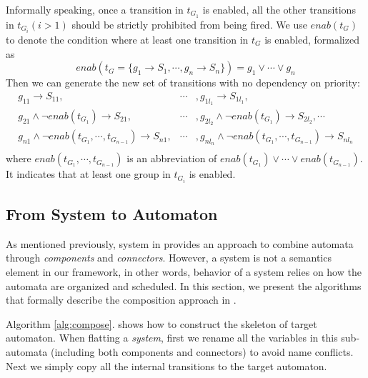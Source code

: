 Informally speaking, once a transition in $t_{G_1}$ is enabled, all the other transitions in $t_{G_i}(i>1)$ should be strictly prohibited from being fired. We use $enab(t_G)$ to denote the condition where at least one transition in $t_G$ is enabled, formalized as
\[
    enab(t_G=\{g_1\rightarrow S_1,\cdots, g_n\rightarrow S_n\}) = g_1\lor\cdots\lor g_n
\]
Then we can generate the new set of transitions with no dependency on priority:
\begin{eqnarray*}
    g_{11}\rightarrow S_{11},&\cdots&,g_{1l_1}\rightarrow S_{1l_1}, \\
    g_{21}\land \lnot enab(t_{G_1})\rightarrow S_{21}, &\cdots&, g_{2l_2} \land \lnot enab(t_{G_1})\rightarrow S_{2l_2}, \cdots \\
    g_{n1}\land \lnot enab(t_{G_1},\cdots,t_{G_{n-1}})\rightarrow S_{n1}, &\cdots&, g_{nl_n} \land \lnot enab(t_{G_1},\cdots,t_{G_{n-1}})\rightarrow S_{nl_n} \\
\end{eqnarray*}
where $enab(t_{G_1},\cdots,t_{G_{n-1}})$ is an abbreviation of $enab(t_{G_1})\lor\cdots\lor enab(t_{G_{n-1}})$. It indicates that at least one group in $t_{G_i}$ is enabled.
\subsection{From System to Automaton}
\label{subsec:composition}

As mentioned previously, system in \lang{} provides an approach to combine automata through \emph{components} and \emph{connectors}. However, a system is not a semantics element in our framework, in other words, behavior of a system relies on how the automata are organized and scheduled. In this section, we present the algorithms that formally describe the composition approach in \lang{}.

Algorithm \ref{alg:compose}. shows how to construct the skeleton of target automaton. When flatting a \emph{system}, first we rename all the variables in this sub-automata (including both components and connectors) to avoid name conflicts. Next we simply copy all the internal transitions to the target automaton. 

